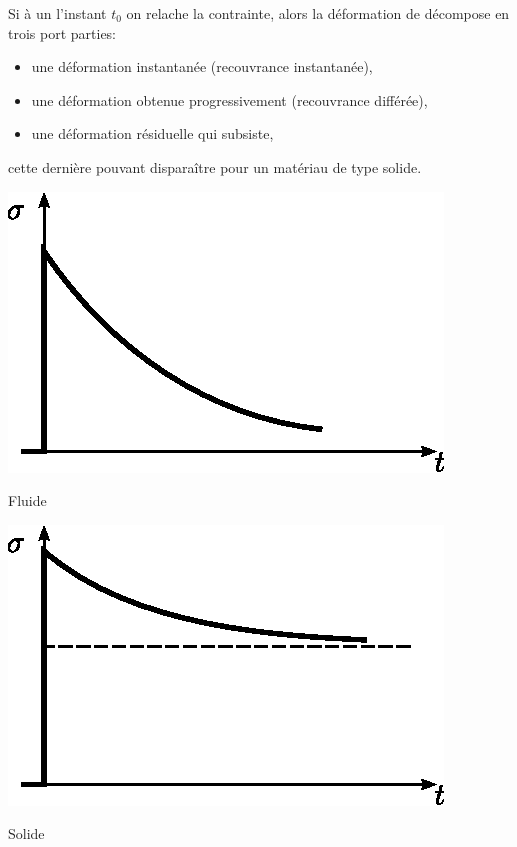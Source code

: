 Si à un l'instant $t_0$ on relache la contrainte, alors la déformation de décompose en trois port parties:
\begin{itemize}
    \item une déformation instantanée (recouvrance instantanée),
    \item une déformation obtenue progressivement (recouvrance différée),
    \item une déformation résiduelle qui subsiste,
\end{itemize}
cette dernière pouvant disparaître pour un matériau de type solide.
\begin{multicols}{2}
    \begin{center}
        \includegraphics{../images/T1_Ch04-0019}

        Fluide
    \end{center}
    \columnbreak
    \begin{center}
        \includegraphics{../images/T1_Ch04-0020}

        Solide
    \end{center}
\end{multicols}

